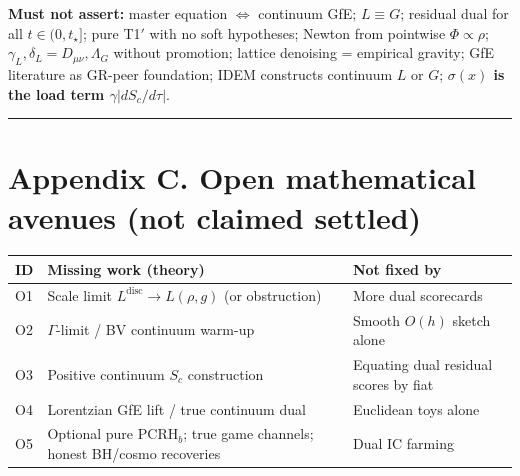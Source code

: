 \documentclass[
  11pt,
]{article}
\newcounter{none} %
\begin{document}
\textbf{Must not assert:} master equation \(\Leftrightarrow\) continuum
GfE; \(L\equiv G\); residual dual for all \(t\in(0,t_\star]\); pure
T1\('\) with no soft hypotheses; Newton from pointwise
\(\Phi\propto\rho\); \(\gamma_L,\delta_L=D_{\mu\nu},\Lambda_G\) without
promotion; lattice denoising = empirical gravity; GfE literature as
GR-peer foundation; IDEM constructs continuum \(L\) or \(G\);
\textbf{\(\sigma(x)\) is the load term
\(\gamma\lvert dS_c/d\tau\rvert\)}.

\begin{center}\rule{0.5\linewidth}{0.5pt}\end{center}

\section{Appendix C. Open mathematical avenues (not claimed
settled)}\label{appendix-c.-open-mathematical-avenues-not-claimed-settled}

{\def\LTcaptype{none} %
\begin{longtable}[]{@{}
  >{\raggedright\arraybackslash}p{}
  >{\raggedright\arraybackslash}p{}
  >{\raggedright\arraybackslash}p{}@{}}
\toprule\noalign{}
\begin{minipage}[b]{\linewidth}\raggedright
ID
\end{minipage} & \begin{minipage}[b]{\linewidth}\raggedright
Missing work (theory)
\end{minipage} & \begin{minipage}[b]{\linewidth}\raggedright
Not fixed by
\end{minipage} \\
\midrule\noalign{}
\endhead
\bottomrule\noalign{}
\endlastfoot
O1 & Scale limit \(L^{\mathrm{disc}}\to L(\rho,g)\) (or obstruction) &
More dual scorecards \\
O2 & \(\Gamma\)-limit / BV continuum warm-up & Smooth \(O(h)\) sketch
alone \\
O3 & Positive continuum \(S_c\) construction & Equating dual residual
scores by fiat \\
O4 & Lorentzian GfE lift / true continuum dual & Euclidean toys alone \\
O5 & Optional pure PCRH\(_b\); true game channels; honest BH/cosmo
recoveries & Dual IC farming \\
\end{longtable}
}
\end{document}
